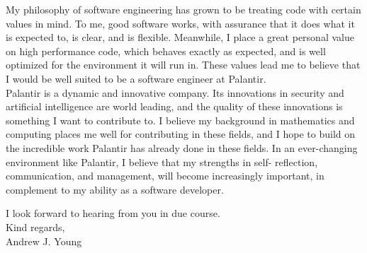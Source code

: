 \documentclass{article}
\begin{document}
My philosophy of software engineering has grown to be treating code with
certain values in mind. To me, good software works, with assurance that it does
what it is expected to, is clear, and is flexible. Meanwhile, I place a great
personal value on high performance code, which behaves exactly as expected, and
is well optimized for the environment it will run in. These values lead me to
believe that I would be well suited to be a software engineer at Palantir.\\

Palantir is a dynamic and innovative company. Its innovations in security and
artificial intelligence are world leading, and the quality of these innovations
is something I want to contribute to. I believe my background in mathematics
and computing places me well for contributing in these fields, and I hope to
build on the incredible work Palantir has already done in these fields. In an
ever-changing environment like Palantir, I believe that my strengths in self-
reflection, communication, and management, will become increasingly important,
in complement to my ability as a software developer.

I look forward to hearing from you in due course.\\

Kind regards,\\

Andrew J. Young\\
\end{document}
